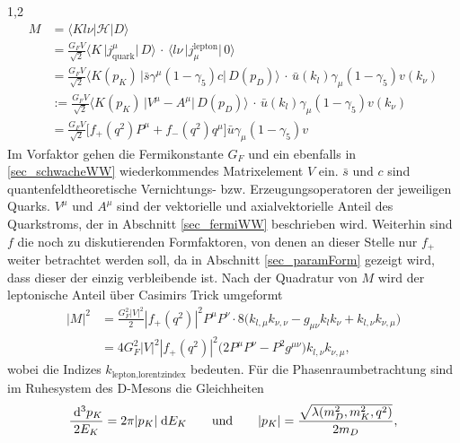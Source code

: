\documentclass[11pt,a4paper,twoside]{report}
\begin{document}
\begin{spacing}{1,2}
\begin{align}
 M &= \big\langle Kl\nu|\mathcal{H}|D\big\rangle\nonumber\\
 &= \frac{G_F V}{\sqrt{2}}\big\langle K\, \big|j_\text{quark}^\mu\big|\,D \big\rangle \,\cdot\,\big\langle l\nu\,\big|j_\mu^\text{lepton}\big|\,0\big\rangle\nonumber\\
 &= \frac{G_F V}{\sqrt{2}}\big\langle K(p_K)\, \big|\bar s \gamma^\mu(1-\gamma_5) c \big|\,D(p_D) \big\rangle \, \cdot \,\bar u(k_l) \gamma_\mu(1-\gamma_5)v(k_\nu)\nonumber\\
 &:= \frac{G_F V}{\sqrt{2}}\big\langle K(p_K)\, \big|V^\mu - A^\mu\big|\,D(p_D) \big\rangle \, \cdot \,\bar u(k_l) \gamma_\mu(1-\gamma_5)v(k_\nu)\nonumber\\
 &=\frac{G_F V}{\sqrt{2}} \big[f_+(q^2) P^\mu  + f_-(q^2) q^\mu\big] \bar u \gamma_\mu(1-\gamma_5)v
 \label{eq_fermiMG_F}
 \end{align}
Im Vorfaktor gehen die Fermikonstante $G_F$ und ein ebenfalls in \ref{sec_schwacheWW} wiederkommendes Matrixelement $V$ ein. $\bar s$ und $c$ sind quantenfeldtheoretische 
Vernichtungs- bzw. Erzeugungsoperatoren der jeweiligen Quarks. $V^\mu$ und $A^\mu$ sind der vektorielle und axialvektorielle Anteil des Quarkstroms, der 
in Abschnitt \ref{sec_fermiWW} beschrieben wird. Weiterhin sind $f$ die noch zu
diskutierenden Formfaktoren, von denen an dieser Stelle nur $f_+$ weiter betrachtet werden soll, da in Abschnitt \ref{sec_paramForm} gezeigt wird, dass dieser
der einzig verbleibende ist. Nach der Quadratur von $M$ wird der leptonische Anteil über 
Casimirs Trick \cite{Griffiths} umgeformt
\begin{align}
 \big|M\big|^2 &= \frac{G_F^2|V|^2}{2}|f_+(q^2)|^2 P^\mu P^\nu \cdot 8\big(k_{l,\mu} k_{\nu,\nu} - g_{\mu\nu}k_lk_\nu + k_{l,\nu}k_{\nu,\mu}\big)\nonumber\\
 &=4G_F^2|V|^2 |f_+(q^2)|^2 \big(2P^\mu P^\nu - P^2 g^{\mu\nu}\big) k_{l,\nu}k_{\nu,\mu},
 \label{eq_fermiMelement}
\end{align}
wobei die Indizes $k_{\text{lepton},\text{lorentzindex}}$ bedeuten. Für die Phasenraumbetrachtung sind im Ruhesystem des D-Mesons die Gleichheiten
\begin{align}
 \frac{\dx^3 p_K}{2E_K} = 2\pi |p_K| \dx E_K \qquad \text{und} \qquad |p_K| = \frac{\sqrt{\lambda(m_D^2,m_K^2,q^2)}}{2m_D},

\end{align}
\end{spacing}
\end{document}
